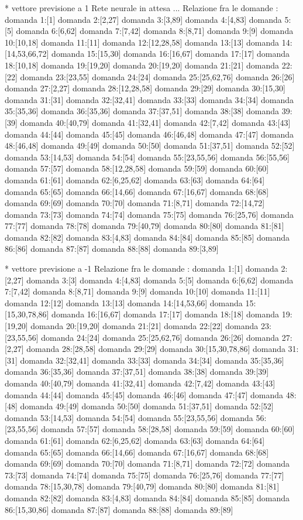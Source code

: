 * vettore previsione a 1
Rete neurale in attesa ...
Relazione fra le domande :
domanda 1:[1]
domanda 2:[2,27]
domanda 3:[3,89]
domanda 4:[4,83]
domanda 5:[5]
domanda 6:[6,62]
domanda 7:[7,42]
domanda 8:[8,71]
domanda 9:[9]
domanda 10:[10,18]
domanda 11:[11]
domanda 12:[12,28,58]
domanda 13:[13]
domanda 14:[14,53,66,72]
domanda 15:[15,30]
domanda 16:[16,67]
domanda 17:[17]
domanda 18:[10,18]
domanda 19:[19,20]
domanda 20:[19,20]
domanda 21:[21]
domanda 22:[22]
domanda 23:[23,55]
domanda 24:[24]
domanda 25:[25,62,76]
domanda 26:[26]
domanda 27:[2,27]
domanda 28:[12,28,58]
domanda 29:[29]
domanda 30:[15,30]
domanda 31:[31]
domanda 32:[32,41]
domanda 33:[33]
domanda 34:[34]
domanda 35:[35,36]
domanda 36:[35,36]
domanda 37:[37,51]
domanda 38:[38]
domanda 39:[39]
domanda 40:[40,79]
domanda 41:[32,41]
domanda 42:[7,42]
domanda 43:[43]
domanda 44:[44]
domanda 45:[45]
domanda 46:[46,48]
domanda 47:[47]
domanda 48:[46,48]
domanda 49:[49]
domanda 50:[50]
domanda 51:[37,51]
domanda 52:[52]
domanda 53:[14,53]
domanda 54:[54]
domanda 55:[23,55,56]
domanda 56:[55,56]
domanda 57:[57]
domanda 58:[12,28,58]
domanda 59:[59]
domanda 60:[60]
domanda 61:[61]
domanda 62:[6,25,62]
domanda 63:[63]
domanda 64:[64]
domanda 65:[65]
domanda 66:[14,66]
domanda 67:[16,67]
domanda 68:[68]
domanda 69:[69]
domanda 70:[70]
domanda 71:[8,71]
domanda 72:[14,72]
domanda 73:[73]
domanda 74:[74]
domanda 75:[75]
domanda 76:[25,76]
domanda 77:[77]
domanda 78:[78]
domanda 79:[40,79]
domanda 80:[80]
domanda 81:[81]
domanda 82:[82]
domanda 83:[4,83]
domanda 84:[84]
domanda 85:[85]
domanda 86:[86]
domanda 87:[87]
domanda 88:[88]
domanda 89:[3,89]

* vettore previsione a -1
Relazione fra le domande :
domanda 1:[1]
domanda 2:[2,27]
domanda 3:[3]
domanda 4:[4,83]
domanda 5:[5]
domanda 6:[6,62]
domanda 7:[7,42]
domanda 8:[8,71]
domanda 9:[9]
domanda 10:[10]
domanda 11:[11]
domanda 12:[12]
domanda 13:[13]
domanda 14:[14,53,66]
domanda 15:[15,30,78,86]
domanda 16:[16,67]
domanda 17:[17]
domanda 18:[18]
domanda 19:[19,20]
domanda 20:[19,20]
domanda 21:[21]
domanda 22:[22]
domanda 23:[23,55,56]
domanda 24:[24]
domanda 25:[25,62,76]
domanda 26:[26]
domanda 27:[2,27]
domanda 28:[28,58]
domanda 29:[29]
domanda 30:[15,30,78,86]
domanda 31:[31]
domanda 32:[32,41]
domanda 33:[33]
domanda 34:[34]
domanda 35:[35,36]
domanda 36:[35,36]
domanda 37:[37,51]
domanda 38:[38]
domanda 39:[39]
domanda 40:[40,79]
domanda 41:[32,41]
domanda 42:[7,42]
domanda 43:[43]
domanda 44:[44]
domanda 45:[45]
domanda 46:[46]
domanda 47:[47]
domanda 48:[48]
domanda 49:[49]
domanda 50:[50]
domanda 51:[37,51]
domanda 52:[52]
domanda 53:[14,53]
domanda 54:[54]
domanda 55:[23,55,56]
domanda 56:[23,55,56]
domanda 57:[57]
domanda 58:[28,58]
domanda 59:[59]
domanda 60:[60]
domanda 61:[61]
domanda 62:[6,25,62]
domanda 63:[63]
domanda 64:[64]
domanda 65:[65]
domanda 66:[14,66]
domanda 67:[16,67]
domanda 68:[68]
domanda 69:[69]
domanda 70:[70]
domanda 71:[8,71]
domanda 72:[72]
domanda 73:[73]
domanda 74:[74]
domanda 75:[75]
domanda 76:[25,76]
domanda 77:[77]
domanda 78:[15,30,78]
domanda 79:[40,79]
domanda 80:[80]
domanda 81:[81]
domanda 82:[82]
domanda 83:[4,83]
domanda 84:[84]
domanda 85:[85]
domanda 86:[15,30,86]
domanda 87:[87]
domanda 88:[88]
domanda 89:[89]


